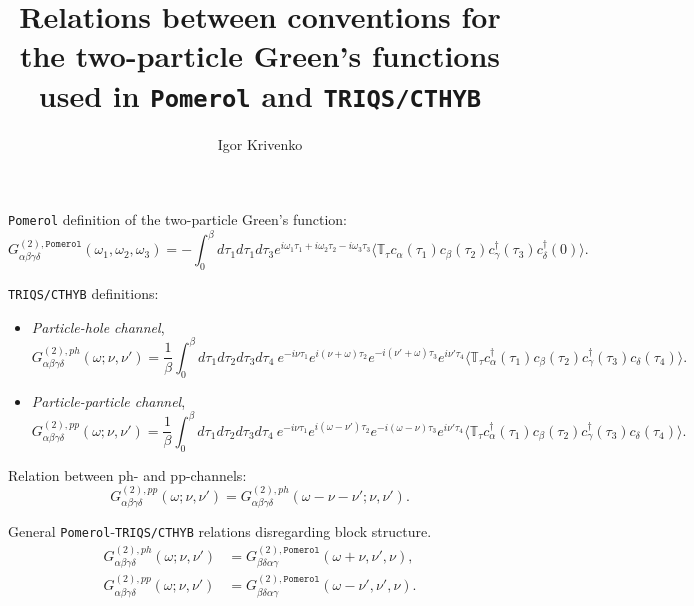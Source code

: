 \documentclass[a4paper,12pt]{article}
\newcommand{\aver}[1]{\ensuremath{\langle#1\rangle}}
\renewcommand{\t}{\ensuremath{\tau}}
\newcommand{\w}{\ensuremath{\omega}}
\newcommand{\n}{\ensuremath{\nu}}
\newcommand{\TT}{\ensuremath{\mathbb{T}_\t}}
\newcommand{\pom}{\ensuremath{\mathtt{Pomerol}}}
\begin{document}
\title{Relations between conventions for the two-particle Green's functions
       used in \texttt{Pomerol} and \texttt{TRIQS/CTHYB}}
\author{Igor Krivenko}
\maketitle

\texttt{Pomerol} definition of the two-particle Green's function:
\begin{equation}\label{g2_pomerol}
	G^{(2),\pom}_{\alpha\beta\gamma\delta}(\w_1,\w_2,\w_3) = 
	- \int_0^\beta d\t_1d\t_1d\t_3
		e^{i\w_1\t_1 + i\w_2\t_2 - i\w_3\t_3}
		\aver{\TT
		c_\alpha(\t_1)c_\beta(\t_2)c^\dag_\gamma(\t_3)c^\dag_\delta(0)}.
\end{equation}

\texttt{TRIQS/CTHYB} definitions:
\begin{itemize}
	\item \textit{Particle-hole channel},
		\begin{equation}\label{g2_ph}
			G^{(2),ph}_{\alpha\beta\gamma\delta}(\w;\n,\n') =
			\frac{1}{\beta}\int_0^\beta d\t_1d\t_2d\t_3d\t_4\
			e^{-i\n\t_1} e^{i(\n+\w)\tau_2} e^{-i(\n'+\w)\t_3} e^{i\n'\t_4}
			\aver{\TT
			c^\dag_\alpha(\t_1) c_\beta(\t_2) c^\dag_\gamma(\t_3) 
			c_\delta(\t_4)}.
	\end{equation}
	
	\item \textit{Particle-particle channel},
		\begin{equation}\label{g2_pp}
			G^{(2),pp}_{\alpha\beta\gamma\delta}(\w;\n,\n') =
			\frac{1}{\beta}\int_0^\beta d\t_1d\t_2d\t_3d\t_4\
			e^{-i\n\t_1} e^{i(\w-\n')\t_2} e^{-i(\w-\n)\t_3} e^{i\n'\t_4}
			\aver{\TT
			c^\dag_\alpha(\t_1) c_\beta(\t_2) c^\dag_\gamma(\t_3) 
			c_\delta(\t_4)}.
		\end{equation}
\end{itemize}

Relation between ph- and pp-channels:
\begin{equation}
	G^{(2),pp}_{\alpha\beta\gamma\delta}(\w;\n,\n') =
	G^{(2),ph}_{\alpha\beta\gamma\delta}(\w-\n-\n';\n,\n').
\end{equation}

General \texttt{Pomerol}-\texttt{TRIQS/CTHYB} relations disregarding block 
structure.
\begin{align}
	G^{(2),ph}_{\alpha\beta\gamma\delta}(\w;\n,\n') &=
	G^{(2),\pom}_{\beta\delta\alpha\gamma}(\w+\n,\n',\n),\\
	G^{(2),pp}_{\alpha\beta\gamma\delta}(\w;\n,\n') &=
	G^{(2),\pom}_{\beta\delta\alpha\gamma}(\w-\n',\n',\n).
\end{align}
\end{document}
